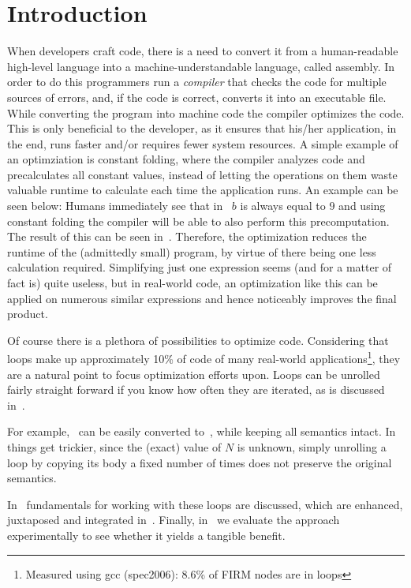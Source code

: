\chapter{Introduction}\label{sec:intro}



When developers craft code, there is a need to convert it from a human-readable high-level language into a machine-understandable language, called assembly.
In order to do this programmers run a \textit{compiler} that checks the code for multiple sources of errors, and, if the code is correct, converts it into an executable file.
While converting the program into machine code the compiler optimizes the code.
This is only beneficial to the developer, as it ensures that his/her application, in the end, runs faster and/or requires fewer system resources.
A simple example of an optimziation is constant folding, where the compiler analyzes code and precalculates all constant values, instead of letting the operations on them waste valuable runtime to calculate each time the application runs.
An example can be seen below:
Humans immediately see that in~ $b$ is always equal to $9$ and using constant folding the compiler will be able to also perform this precomputation.
The result of this can be seen in~.
Therefore, the optimization reduces the runtime of the (admittedly small) program, by virtue of there being one less calculation required.
Simplifying just one expression seems (and for a matter of fact is) quite useless, but in real-world code, an optimization like this can be applied on numerous similar expressions and hence noticeably improves the final product.



Of course there is a plethora of possibilities to optimize code.
Considering that loops make up approximately 10\% of code of many real-world applications\footnote{Measured using gcc (spec2006): 8.6\% of FIRM nodes are in loops}, they are a natural point to focus optimization efforts upon.
Loops can be unrolled fairly straight forward if you know how often they are iterated, as is discussed in~.

For example,~ can be easily converted to~, while keeping all semantics intact.
In~ things get trickier, since the (exact) value of $N$ is unknown, simply unrolling a loop by copying its body a fixed number of times does not preserve the original semantics.

In~ fundamentals for working with these loops are discussed, which are enhanced, juxtaposed and integrated in~.
Finally, in~ we evaluate the approach experimentally to see whether it yields a tangible benefit.




